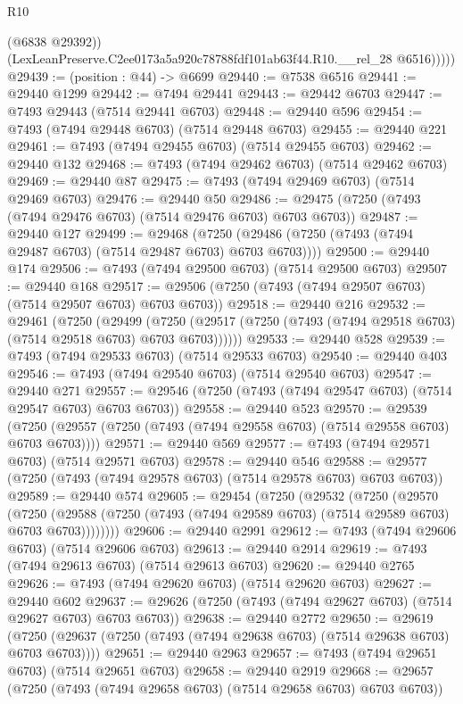 \begin{lexlean}{R10}
\begin{coremodule}
              (@6838 @29392))
            (LexLeanPreserve.C2ee0173a5a920c78788fdf101ab63f44.R10.__rel_28 @6516)))))
@29439 := (position : @44) -> @6699
@29440 := @7538 @6516
@29441 := @29440 @1299
@29442 := @7494 @29441
@29443 := @29442 @6703
@29447 := @7493 @29443 (@7514 @29441 @6703)
@29448 := @29440 @596
@29454 := @7493 (@7494 @29448 @6703) (@7514 @29448 @6703)
@29455 := @29440 @221
@29461 := @7493 (@7494 @29455 @6703) (@7514 @29455 @6703)
@29462 := @29440 @132
@29468 := @7493 (@7494 @29462 @6703) (@7514 @29462 @6703)
@29469 := @29440 @87
@29475 := @7493 (@7494 @29469 @6703) (@7514 @29469 @6703)
@29476 := @29440 @50
@29486 := @29475 (@7250 (@7493 (@7494 @29476 @6703) (@7514 @29476 @6703) @6703 @6703))
@29487 := @29440 @127
@29499 := @29468
    (@7250 (@29486 (@7250 (@7493 (@7494 @29487 @6703) (@7514 @29487 @6703) @6703 @6703))))
@29500 := @29440 @174
@29506 := @7493 (@7494 @29500 @6703) (@7514 @29500 @6703)
@29507 := @29440 @168
@29517 := @29506 (@7250 (@7493 (@7494 @29507 @6703) (@7514 @29507 @6703) @6703 @6703))
@29518 := @29440 @216
@29532 := @29461
    (@7250
      (@29499
        (@7250 (@29517 (@7250 (@7493 (@7494 @29518 @6703) (@7514 @29518 @6703) @6703 @6703))))))
@29533 := @29440 @528
@29539 := @7493 (@7494 @29533 @6703) (@7514 @29533 @6703)
@29540 := @29440 @403
@29546 := @7493 (@7494 @29540 @6703) (@7514 @29540 @6703)
@29547 := @29440 @271
@29557 := @29546 (@7250 (@7493 (@7494 @29547 @6703) (@7514 @29547 @6703) @6703 @6703))
@29558 := @29440 @523
@29570 := @29539
    (@7250 (@29557 (@7250 (@7493 (@7494 @29558 @6703) (@7514 @29558 @6703) @6703 @6703))))
@29571 := @29440 @569
@29577 := @7493 (@7494 @29571 @6703) (@7514 @29571 @6703)
@29578 := @29440 @546
@29588 := @29577 (@7250 (@7493 (@7494 @29578 @6703) (@7514 @29578 @6703) @6703 @6703))
@29589 := @29440 @574
@29605 := @29454
    (@7250
      (@29532
        (@7250
          (@29570
            (@7250
              (@29588 (@7250 (@7493 (@7494 @29589 @6703) (@7514 @29589 @6703) @6703 @6703))))))))
@29606 := @29440 @2991
@29612 := @7493 (@7494 @29606 @6703) (@7514 @29606 @6703)
@29613 := @29440 @2914
@29619 := @7493 (@7494 @29613 @6703) (@7514 @29613 @6703)
@29620 := @29440 @2765
@29626 := @7493 (@7494 @29620 @6703) (@7514 @29620 @6703)
@29627 := @29440 @602
@29637 := @29626 (@7250 (@7493 (@7494 @29627 @6703) (@7514 @29627 @6703) @6703 @6703))
@29638 := @29440 @2772
@29650 := @29619
    (@7250 (@29637 (@7250 (@7493 (@7494 @29638 @6703) (@7514 @29638 @6703) @6703 @6703))))
@29651 := @29440 @2963
@29657 := @7493 (@7494 @29651 @6703) (@7514 @29651 @6703)
@29658 := @29440 @2919
@29668 := @29657 (@7250 (@7493 (@7494 @29658 @6703) (@7514 @29658 @6703) @6703 @6703))

\end{coremodule}
\end{lexlean}
